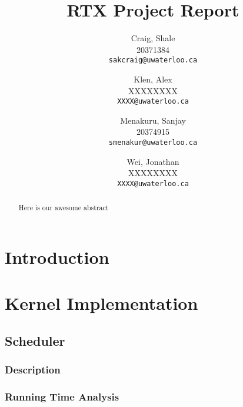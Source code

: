 \documentclass[12pt]{report}
\begin{document}

\title{RTX Project Report}

\author{
    Craig, Shale\\
    20371384\\
    \texttt{sakcraig@uwaterloo.ca}
    \and
    Klen, Alex\\
    XXXXXXXX\\
    \texttt{XXXX@uwaterloo.ca}
    \and
    Menakuru, Sanjay\\
    20374915\\
    \texttt{smenakur@uwaterloo.ca}
    \and
    Wei, Jonathan\\
    XXXXXXXX\\
    \texttt{XXXX@uwaterloo.ca}
}

\maketitle

\begin{abstract}
    Here is our awesome abstract
\end{abstract}

\tableofcontents
\listofalgorithms



\part{Introduction}

\part{Kernel Implementation}

\chapter{Scheduler}

\section{Description}

\section{Running Time Analysis}
\end{document}
